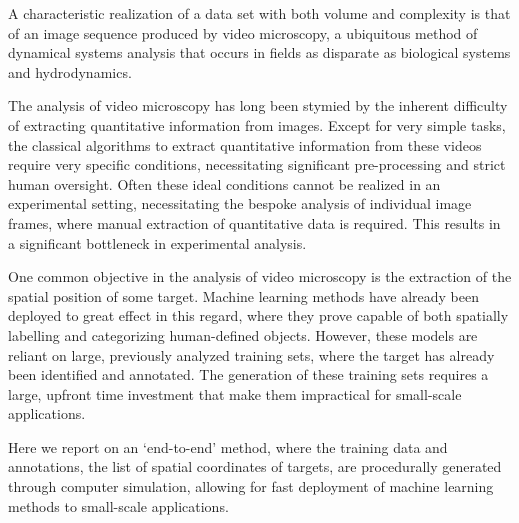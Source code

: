 \documentclass[prl,reprint,showpacs,floatfix,nofootinbib]{revtex4-1}
\begin{document}
A characteristic realization of a data set with both volume and complexity is that of an image sequence produced by video microscopy, a ubiquitous method of dynamical systems analysis that occurs in fields as disparate as biological systems\cite{kner_super-resolution_2009} and hydrodynamics\cite{crocker_methods_1996}.

The analysis of video microscopy has long been stymied by the inherent difficulty of extracting quantitative information from images\cite{baumgartl_limits_2005}.  Except for very simple tasks, the classical algorithms to extract quantitative information from these videos require very specific conditions\cite{conte_thirty_2004}, necessitating significant pre-processing and strict human oversight. Often these ideal conditions cannot be realized in an experimental setting, necessitating the bespoke analysis of individual image frames, where manual extraction of quantitative data is required. This results in a significant bottleneck in experimental analysis.

One common objective in the analysis of video microscopy is the extraction of the spatial position of some target. Machine learning methods have already been deployed to great effect in this regard, where they prove capable of both spatially labelling and categorizing human-defined objects. However, these models are reliant on large, previously analyzed training sets, where the target has already been identified and annotated. The generation of these training sets requires a large, upfront time investment that make them impractical for small-scale applications.

Here we report on an `end-to-end' method, where the training data and annotations, the list of spatial coordinates of targets, are procedurally generated through computer simulation, allowing for fast deployment of machine learning methods to small-scale applications.

\end{document}
